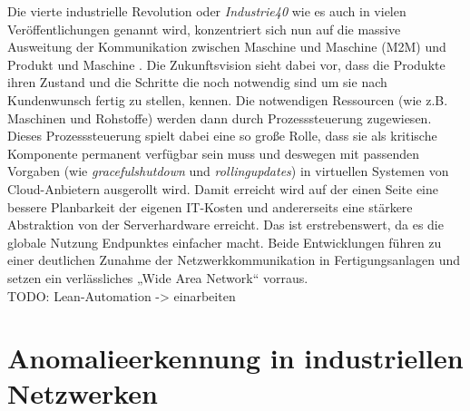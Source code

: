 Die vierte industrielle Revolution oder \textit{\Gls{Industrie40}} wie es auch in vielen Veröffentlichungen genannt wird, konzentriert sich nun auf die massive Ausweitung der Kommunikation zwischen Maschine und Maschine (\Gls{M2M}) und Produkt und Maschine \cite{lasi2014industry}. Die Zukunftsvision sieht dabei vor, dass die Produkte ihren Zustand und die Schritte die noch notwendig sind um sie nach Kundenwunsch fertig zu stellen, kennen. Die notwendigen Ressourcen (wie z.B. Maschinen und Rohstoffe) werden dann durch Prozesssteuerung zugewiesen. Dieses Prozesssteuerung spielt dabei eine so große Rolle, dass sie als kritische Komponente permanent verfügbar sein muss und deswegen mit passenden Vorgaben (wie \textit{\Gls{gracefulshutdown}} und \textit{\Gls{rollingupdates}}) in virtuellen Systemen von Cloud-Anbietern ausgerollt wird. Damit erreicht wird auf der einen Seite eine bessere Planbarkeit der eigenen IT-Kosten und andererseits eine stärkere Abstraktion von der Serverhardware erreicht. Das ist erstrebenswert, da es die globale Nutzung Endpunktes einfacher macht\cite{wollschlaeger2017future}. Beide Entwicklungen führen zu einer deutlichen Zunahme der Netzwerkkommunikation in Fertigungsanlagen und setzen ein verlässliches „Wide Area Network“ vorraus.\\

TODO: Lean-Automation -> einarbeiten

\section{Anomalieerkennung in industriellen Netzwerken}
